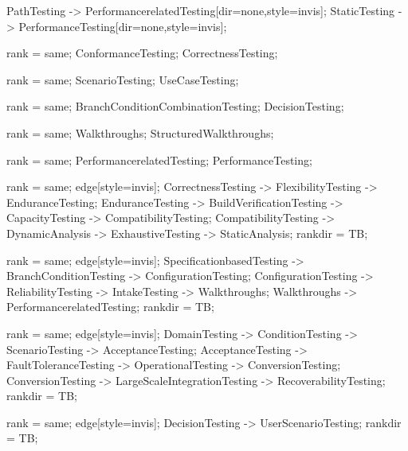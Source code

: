\documentclass{article}
\begin{document}
{PathTesting -> PerformancerelatedTesting[dir=none,style=invis];
StaticTesting -> PerformanceTesting[dir=none,style=invis];

{
rank = same;
ConformanceTesting;
CorrectnessTesting;
}

{
rank = same;
ScenarioTesting;
UseCaseTesting;
}

{
rank = same;
BranchConditionCombinationTesting;
DecisionTesting;
}

{
rank = same;
Walkthroughs;
StructuredWalkthroughs;
}

{
rank = same;
PerformancerelatedTesting;
PerformanceTesting;
}

{
rank = same;
edge[style=invis];
CorrectnessTesting -> FlexibilityTesting -> EnduranceTesting;
EnduranceTesting -> BuildVerificationTesting -> CapacityTesting -> CompatibilityTesting;
CompatibilityTesting -> DynamicAnalysis -> ExhaustiveTesting -> StaticAnalysis;
rankdir = TB;
}

{
rank = same;
edge[style=invis];
SpecificationbasedTesting -> BranchConditionTesting -> ConfigurationTesting;
ConfigurationTesting -> ReliabilityTesting -> IntakeTesting -> Walkthroughs;
Walkthroughs -> PerformancerelatedTesting;
rankdir = TB;
}

{
rank = same;
edge[style=invis];
DomainTesting -> ConditionTesting -> ScenarioTesting -> AcceptanceTesting;
AcceptanceTesting -> FaultToleranceTesting -> OperationalTesting -> ConversionTesting;
ConversionTesting -> LargeScaleIntegrationTesting -> RecoverabilityTesting;
rankdir = TB;
}

{
rank = same;
edge[style=invis];
DecisionTesting -> UserScenarioTesting;
rankdir = TB;
}

}
\end{document}
